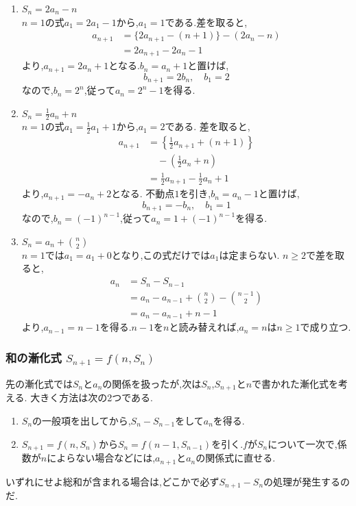     \noindent{}\par\nobreak
    \begin{enumerate}[label=(\arabic*),parsep=3pt,format=\bookitemlink{example-summation-1}{solution}{problem}]
      \item $S_n=2a_n-n$\\
        $n=1$の式$a_1=2a_1-1$から,$a_1=1$である.差を取ると,
        \begin{align*}
          a_{n+1}&=\{2a_{n+1}-(n+1)\}-(2a_n-n)\\
          &=2a_{n+1}-2a_n-1
        \end{align*}
        より,$a_{n+1}=2a_n+1$となる.$b_n=a_n+1$と置けば,
        \[
          b_{n+1}=2b_n,\quad b_1=2
        \]
        なので,$b_n=2^n$,従って$a_n=2^n-1$を得る.
      \item $S_n=\frac12a_n+n$\\
        $n=1$の式$a_1=\frac12a_1+1$から,$a_1=2$である.
        差を取ると,
        \begin{align*}
          a_{n+1}&=\left\{\frac12a_{n+1}+(n+1)\right\}\\
          &\quad-\left(\frac12a_n+n\right)\\
          &=\frac12a_{n+1}-\frac12a_n+1
        \end{align*}
        より,$a_{n+1}=-a_n+2$となる.
        不動点$1$を引き,$b_n=a_n-1$と置けば,
        \[
          b_{n+1}=-b_n,\quad b_1=1
        \]
        なので,$b_n=(-1)^{n-1}$,従って$a_n=1+(-1)^{n-1}$を得る.
      \item $S_n=a_n+\binom n2$\\
        $n=1$では$a_1=a_1+0$となり,この式だけでは$a_1$は定まらない.
        $n\ge2$で差を取ると,
        \begin{align*}
          a_n&=S_n-S_{n-1}\\
          &=a_n-a_{n-1}+\binom n2-\binom{n-1}2\\
          &=a_n-a_{n-1}+n-1
        \end{align*}
        より,$a_{n-1}=n-1$を得る.$n-1$を$n$と読み替えれば,$a_n=n$は$n\ge1$で成り立つ.
    \end{enumerate}
    
  \subsubsection{\texorpdfstring{和の漸化式  $S_{n+1}=f(n,S_n)$}{和の漸化式}}
    先の漸化式では$S_n$と$a_n$の関係を扱ったが,次は$S_n$,$S_{n+1}$と$n$で書かれた漸化式を考える.
    大きく方法は次の2つである.
    \begin{enumerate}
      \item $S_n$の一般項を出してから,$S_{n}-S_{n-1}$をして$a_n$を得る.
      \item $S_{n+1}=f(n,S_n)$から$S_{n}=f(n-1,S_{n-1})$を引く.$f$が$S_n$について一次で,係数が$n$によらない場合などには,$a_{n+1}$と$a_n$の関係式に直せる.
    \end{enumerate}
    いずれにせよ総和が含まれる場合は,どこかで必ず$S_{n+1}-S_n$の処理が発生するのだ.
    
